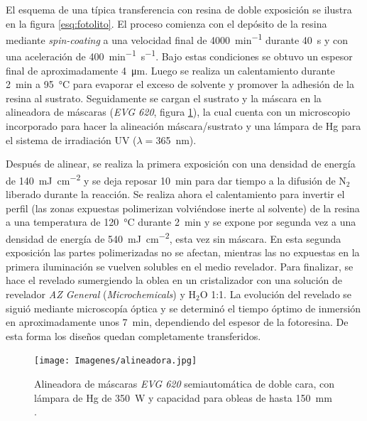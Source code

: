 		El esquema de una típica transferencia con resina de doble exposición se ilustra en la figura \ref{esq:fotolito}. El proceso comienza con el depósito de la resina mediante \textit{spin-coating} a una velocidad final de \SI{4000}{\minute^{-1}} durante \SI{40}{\second} y con una aceleración de \SI{400}{\minute^{-1}.\second^{-1}}. Bajo estas condiciones se obtuvo un espesor final de aproximadamente \SI{4}{\um}. Luego se realiza un calentamiento durante \SI{2}{\minute} a \SI{95}{\celsius} para evaporar el exceso de solvente y promover la adhesión de la resina al sustrato. Seguidamente se cargan el sustrato y la máscara en la alineadora de máscaras (\textit{EVG 620}, figura \ref{fig:alineadora}), la cual cuenta con un microscopio incorporado para hacer la alineación máscara/sustrato y una lámpara de Hg para el sistema de irradiación UV ($\lambda=$\SI{365}{\nm}). 
				
		Después de alinear, se realiza la primera exposición con una densidad de energía de \SI{140}{mJ.\cm^{-2}} y se deja reposar \SI{10}{\minute} para dar tiempo a la difusión de N$_2$ liberado durante la reacción. Se realiza ahora el calentamiento para invertir el perfil (las zonas expuestas polimerizan volviéndose inerte al solvente) de la resina a una temperatura de \SI{120}{\celsius} durante \SI{2}{\minute}  y se expone por segunda vez a una densidad de energía de \SI{540}{mJ.cm^{-2}}, esta vez sin máscara. En esta segunda exposición las partes polimerizadas no se afectan, mientras las no expuestas en la primera iluminación se vuelven solubles en el medio revelador. Para finalizar, se hace el revelado sumergiendo la oblea en un cristalizador con una solución de revelador \textit{AZ General} (\textit{Microchemicals}) y H$_2$O 1:1. La evolución del revelado se siguió mediante microscopía óptica y se determinó el tiempo óptimo de inmersión en aproximadamente unos \SI{7}{\minute}, dependiendo del espesor de la fotoresina. De esta forma los diseños quedan completamente transferidos.
				
			  \begin{figure}[h!]
			  \begin{center}
			  \texttt{[image: Imagenes/alineadora.jpg]}
			  \caption[Alineadora de máscaras]{Alineadora de máscaras \textit{EVG 620} semiautomática de doble cara, con lámpara de Hg de \SI{350}{W}  y capacidad para obleas de hasta \SI{150}{\mm} .}
			  \label{fig:alineadora}
			  \end{center}
			  \end{figure}

